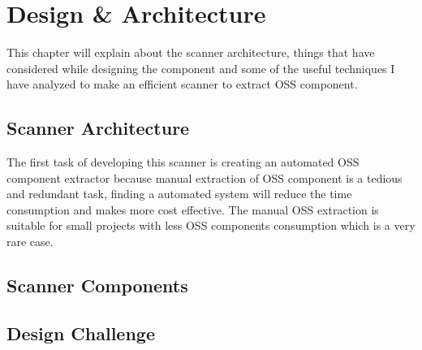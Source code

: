%
\section{Design \& Architecture}\label{sec:design_architecture}
%
This chapter will explain about the scanner architecture, things that have considered while designing the component and some of the useful techniques I have analyzed to make an efficient scanner to extract \acs{OSS} component.

\subsection{Scanner Architecture}
 The first task of developing this scanner is creating an automated \acs{OSS} component extractor because manual extraction of \acs{OSS} component is a tedious and redundant task, finding a automated system will reduce the time consumption and makes more cost effective. The manual \acs{OSS} extraction is suitable for small projects with less \acs{OSS} components consumption which is a very rare case.  
\subsection{Scanner Components}

\subsection{Design Challenge}
%
